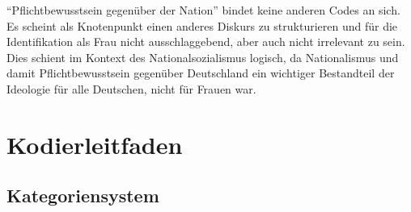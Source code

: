 \documentclass[12pt, titlepage=true, toc=bib]{scrartcl}
\begin{document}
"`Pflichtbewusstsein gegenüber der Nation"' bindet keine anderen Codes an sich. Es scheint als Knotenpunkt einen anderes Diskurs zu strukturieren und für die Identifikation als Frau nicht ausschlaggebend, aber auch nicht irrelevant zu sein. Dies schient im Kontext des Nationalsozialismus logisch, da Nationalismus und damit Pflichtbewusstsein gegenüber Deutschland ein wichtiger Bestandteil der Ideologie für alle Deutschen, nicht für Frauen war.



\newpage

\printbibheading[title=Literaturverzeichnis]
\printbibliography[heading=subbibliography, keyword={Quelle}, title={Quellen}]
\printbibliography[heading=subbibliography, notkeyword={Quelle}]
\newpage

\appendix

\addpart{\appendixname}

\section{Kodierleitfaden}

\subsection*{Kategoriensystem}
\end{document}
